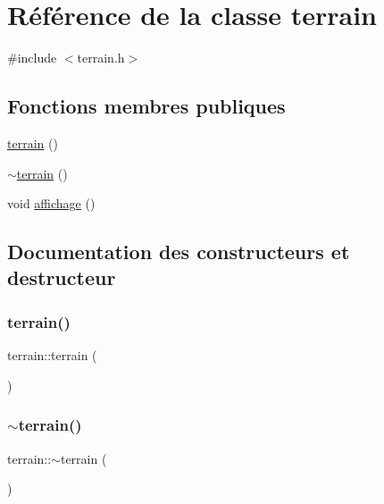 \hypertarget{classterrain}{}\section{Référence de la classe terrain}
\label{classterrain}


{\ttfamily \#include $<$terrain.\+h$>$}

\subsection*{Fonctions membres publiques}
\begin{DoxyCompactItemize}
\item 
\hyperlink{classterrain_a97d75c16b1226be3898577ea99d8b4ad}{terrain} ()
\item 
\hyperlink{classterrain_af2c63d5c5044ef71b5621110e4aaccf0}{$\sim$terrain} ()
\item 
void \hyperlink{classterrain_afe65cfabb619a0c0ffd9f3c9bdaa0e1f}{affichage} ()
\end{DoxyCompactItemize}


\subsection{Documentation des constructeurs et destructeur}
\mbox{\label{classterrain_a97d75c16b1226be3898577ea99d8b4ad}} 
\subsubsection{\texorpdfstring{terrain()}{terrain()}}
{\footnotesize\ttfamily terrain\+::terrain (\begin{DoxyParamCaption}{ }\end{DoxyParamCaption})}

\mbox{\label{classterrain_af2c63d5c5044ef71b5621110e4aaccf0}} 
\subsubsection{\texorpdfstring{$\sim$terrain()}{~terrain()}}
{\footnotesize\ttfamily terrain\+::$\sim$terrain (\begin{DoxyParamCaption}{ }\end{DoxyParamCaption})}



